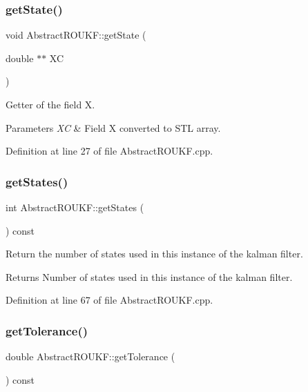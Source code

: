 \subsubsection{\texorpdfstring{get\+State()}{getState()}}
{\footnotesize\ttfamily void Abstract\+R\+O\+U\+K\+F\+::get\+State (\begin{DoxyParamCaption}\item[{double $\ast$$\ast$}]{XC }\end{DoxyParamCaption})}

Getter of the field {\ttfamily X}. 
\begin{DoxyParams}{Parameters}
{\em XC} & Field {\ttfamily X} converted to S\+TL array. \\
\hline
\end{DoxyParams}


Definition at line 27 of file Abstract\+R\+O\+U\+K\+F.\+cpp.

\mbox{\label{classAbstractROUKF_a904fa28784c0bf5ed96502b6bea74346}} 
\subsubsection{\texorpdfstring{get\+States()}{getStates()}}
{\footnotesize\ttfamily int Abstract\+R\+O\+U\+K\+F\+::get\+States (\begin{DoxyParamCaption}{ }\end{DoxyParamCaption}) const}

Return the number of states used in this instance of the kalman filter. \begin{DoxyReturn}{Returns}
Number of states used in this instance of the kalman filter. 
\end{DoxyReturn}


Definition at line 67 of file Abstract\+R\+O\+U\+K\+F.\+cpp.

\mbox{\label{classAbstractROUKF_a408197857ee4f8084170a8240db1eb29}} 
\subsubsection{\texorpdfstring{get\+Tolerance()}{getTolerance()}}
{\footnotesize\ttfamily double Abstract\+R\+O\+U\+K\+F\+::get\+Tolerance (\begin{DoxyParamCaption}{ }\end{DoxyParamCaption}) const}

